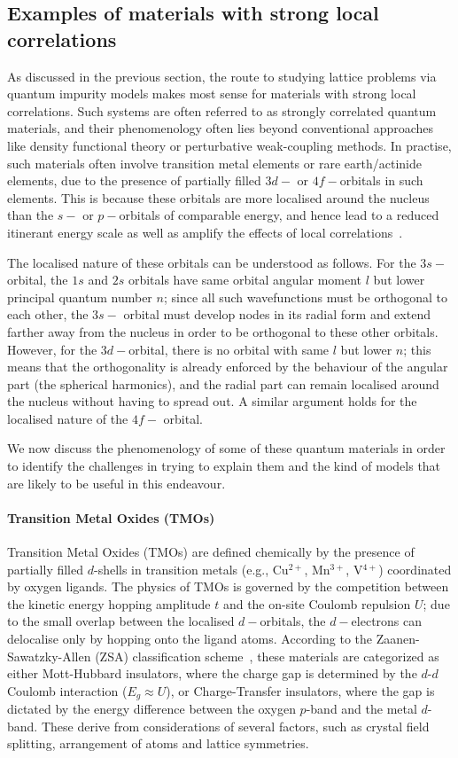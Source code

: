 \subsection{Examples of materials with strong local correlations}
As discussed in the previous section, the route to studying lattice problems via quantum impurity models makes most sense for materials with strong local correlations. Such systems are often referred to as strongly correlated quantum materials, and their phenomenology often lies beyond conventional approaches like density functional theory or perturbative weak-coupling methods. In practise, such materials often involve transition metal elements or rare earth/actinide elements, due to the presence of partially filled \(3d-\) or \(4f-\)orbitals in such elements. This is because these orbitals are more localised around the nucleus than the \(s-\) or \(p-\)orbitals of comparable energy, and hence lead to a reduced itinerant energy scale as well as amplify the effects of local correlations~\cite{georges_2004_dmft}. 

The localised nature of these orbitals can be understood as follows. For the \(3s-\)orbital, the \(1s\) and \(2s\) orbitals have same orbital angular moment \(l\) but lower principal quantum number \(n\); since all such wavefunctions must be orthogonal to each other, the \(3s-\) orbital must develop nodes in  its radial form and extend farther away from the nucleus in order to be orthogonal to these other orbitals. However, for the \(3d-\)orbital, there is no orbital with same \(l\) but lower \(n\); this means that the orthogonality is already enforced by the behaviour of the angular part (the spherical harmonics), and the radial part can remain localised around the nucleus without having to spread out. A similar argument holds for the localised nature of the \(4f-\) orbital.

We now discuss the phenomenology of some of these quantum materials in order to identify the challenges in trying to explain them and the kind of models that are likely to be useful in this endeavour.

\paragraph{Transition Metal Oxides (TMOs)}
Transition Metal Oxides (TMOs) are defined chemically by the presence of partially filled $d$-shells in transition metals (e.g., Cu$^{2+}$, Mn$^{3+}$, V$^{4+}$) coordinated by oxygen ligands. The physics of TMOs is governed by the competition between the kinetic energy hopping amplitude $t$ and the on-site Coulomb repulsion $U$; due to the small overlap between the localised \(d-\)orbitals, the \(d-\)electrons can delocalise only by hopping onto the ligand atoms. According to the Zaanen-Sawatzky-Allen (ZSA) classification scheme~\cite{Zaanen1985}, these materials are categorized as either Mott-Hubbard insulators, where the charge gap is determined by the $d$-$d$ Coulomb interaction ($E_g \approx U$), or Charge-Transfer insulators, where the gap is dictated by the energy difference between the oxygen $p$-band and the metal $d$-band. These derive from considerations of several factors, such as crystal field splitting, arrangement of atoms and lattice symmetries. 

